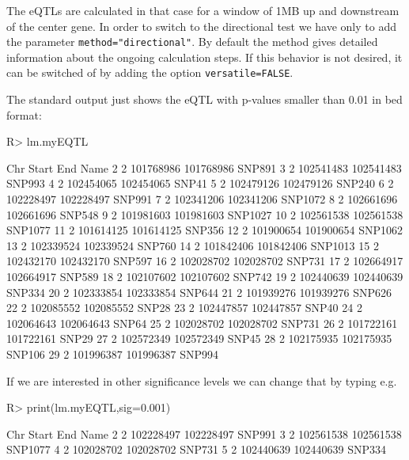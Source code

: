 \documentclass[a4paper,10pt]{article}
\begin{document}
The eQTLs are calculated in that case for a window of 1MB up and downstream of the center gene.
In order to switch to the directional test we have only to add the parameter \texttt{method="directional"}. By default the method
gives detailed information about the ongoing calculation steps. If this behavior is not desired, it can be switched of by adding the 
option \texttt{versatile=FALSE}. 


The standard output just shows the eQTL with p-values smaller than 0.01 in bed format:

\begin{Schunk}
\begin{Sinput}
R> lm.myEQTL
\end{Sinput}
\begin{Soutput}
   Chr     Start       End    Name
2    2 101768986 101768986  SNP891
3    2 102541483 102541483  SNP993
4    2 102454065 102454065   SNP41
5    2 102479126 102479126  SNP240
6    2 102228497 102228497  SNP991
7    2 102341206 102341206 SNP1072
8    2 102661696 102661696  SNP548
9    2 101981603 101981603 SNP1027
10   2 102561538 102561538 SNP1077
11   2 101614125 101614125  SNP356
12   2 101900654 101900654 SNP1062
13   2 102339524 102339524  SNP760
14   2 101842406 101842406 SNP1013
15   2 102432170 102432170  SNP597
16   2 102028702 102028702  SNP731
17   2 102664917 102664917  SNP589
18   2 102107602 102107602  SNP742
19   2 102440639 102440639  SNP334
20   2 102333854 102333854  SNP644
21   2 101939276 101939276  SNP626
22   2 102085552 102085552   SNP28
23   2 102447857 102447857   SNP40
24   2 102064643 102064643   SNP64
25   2 102028702 102028702  SNP731
26   2 101722161 101722161   SNP29
27   2 102572349 102572349   SNP45
28   2 102175935 102175935  SNP106
29   2 101996387 101996387  SNP994
\end{Soutput}
\end{Schunk}

If we are interested in other significance levels we can change that by typing e.g. 

\begin{Schunk}
\begin{Sinput}
R> print(lm.myEQTL,sig=0.001)
\end{Sinput}
\begin{Soutput}
  Chr     Start       End    Name
2   2 102228497 102228497  SNP991
3   2 102561538 102561538 SNP1077
4   2 102028702 102028702  SNP731
5   2 102440639 102440639  SNP334
\end{Soutput}
\end{Schunk}
\end{document}
